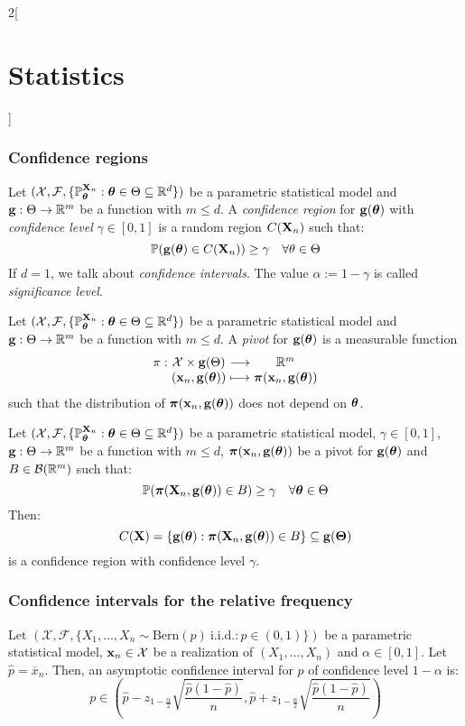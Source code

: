 \documentclass[../../../main.tex]{subfiles}
\begin{document}
\begin{multicols}{2}[\section{Statistics}]
  \subsubsection{Confidence regions}
  \begin{definition}
    Let $(\mathcal{X},\mathcal{F},\{\mathbb{P}_{\boldsymbol{\mathrm{\theta}}}^{\boldsymbol{\mathrm{X}}_n}:\boldsymbol{\mathrm{\theta}}\in\Theta\subseteq\mathbb{R}^d\})$ be a parametric statistical model and $\boldsymbol{\mathrm{g}}:\Theta\rightarrow\mathbb{R}^m$ be a function with $m\leq d$. A \emph{confidence region} for $\boldsymbol{\mathrm{g}}(\boldsymbol{\mathrm{\theta}})$ with \emph{confidence level} $\gamma\in[0,1]$ is a random region $C(\boldsymbol{\mathrm{X}}_n)$ such that: $$\mathbb{P}(\boldsymbol{\mathrm{g}}(\boldsymbol{\mathrm{\theta}})\in C(\boldsymbol{\mathrm{X}}_n))\geq \gamma\quad\forall \theta\in\Theta$$ If $d=1$, we talk about \emph{confidence intervals}. The value $\alpha:=1-\gamma$ is called \emph{significance level}.
  \end{definition}
  \begin{definition}
    Let $(\mathcal{X},\mathcal{F},\{\mathbb{P}_{\boldsymbol{\mathrm{\theta}}}^{\boldsymbol{\mathrm{X}}_n}:\boldsymbol{\mathrm{\theta}}\in\Theta\subseteq\mathbb{R}^d\})$ be a parametric statistical model and $\boldsymbol{\mathrm{g}}:\Theta\rightarrow\mathbb{R}^m$ be a function with $m\leq d$. A \emph{pivot} for $\boldsymbol{\mathrm{g}}(\boldsymbol{\mathrm{\theta}})$ is a measurable function
    $$\function{\pi}{\mathcal{X}\times \vf{g}(\Theta)}{\RR^m}{(\vf{x}_n,\vf{g}(\vf\theta))}{\vf\pi(\vf{x}_n,\vf{g}(\vf\theta))}$$
    such that the distribution of $\boldsymbol{\mathrm{\pi}}(\boldsymbol{\mathrm{x}}_n,\boldsymbol{\mathrm{g}}(\boldsymbol{\mathrm{\theta}}))$ does not depend on $\boldsymbol{\mathrm{\theta}}$.
  \end{definition}
  \begin{proposition}
    Let $(\mathcal{X},\mathcal{F},\{\mathbb{P}_{\boldsymbol{\mathrm{\theta}}}^{\boldsymbol{\mathrm{X}}_n}:\boldsymbol{\mathrm{\theta}}\in\Theta\subseteq\mathbb{R}^d\})$ be a parametric statistical model, $\gamma\in[0,1]$, $\boldsymbol{\mathrm{g}}:\Theta\rightarrow\mathbb{R}^m$ be a function with $m\leq d$, $\boldsymbol{\mathrm{\pi}}(\boldsymbol{\mathrm{x}}_n,\boldsymbol{\mathrm{g}}(\boldsymbol{\mathrm{\theta}}))$ be a pivot for $\boldsymbol{\mathrm{g}}(\boldsymbol{\mathrm{\theta}})$ and $B\in\mathcal{B}(\mathbb{R}^m)$ such that: $$\mathbb{P}(\boldsymbol{\mathrm{\pi}}(\boldsymbol{\mathrm{X}}_n,\boldsymbol{\mathrm{g}}(\boldsymbol{\mathrm{\theta}}))\in B)\geq \gamma\quad\forall \boldsymbol{\mathrm{\theta}}\in\Theta$$
    Then: $$C(\boldsymbol{\mathrm{X}})=\{\boldsymbol{\mathrm{g}}(\boldsymbol{\mathrm{\theta}}):\boldsymbol{\mathrm{\pi}}(\boldsymbol{\mathrm{X}}_n,\boldsymbol{\mathrm{g}}(\boldsymbol{\mathrm{\theta}}))\in B\}\subseteq \boldsymbol{\mathrm{g}}(\boldsymbol{\mathrm{\Theta}})$$
    is a confidence region with confidence level $\gamma$.
  \end{proposition}
  \subsubsection{Confidence intervals for the relative frequency}
  \begin{proposition}
    Let $(\mathcal{X},\mathcal{F},\{X_1,\ldots,X_n\sim\text{Bern}(p)\ \text{i.i.d.}:p\in(0,1)\})$ be a parametric statistical model, $\boldsymbol{\mathrm{x}}_n\in\mathcal{X}$ be a realization of $(X_1,\ldots,X_n)$ and $\alpha\in[0,1]$. Let $\hat{p}=\overline{x}_n$. Then, an asymptotic confidence interval for $p$ of confidence level $1-\alpha$ is:
    $$p\in\left(\hat{p}-z_{1-\frac{\alpha}{2}}\sqrt{\frac{\hat{p}(1-\hat{p})}{n}},\hat{p}+z_{1-\frac{\alpha}{2}}\sqrt{\frac{\hat{p}(1-\hat{p})}{n}}\right)$$
  \end{proposition}

\end{multicols}
\end{document}
